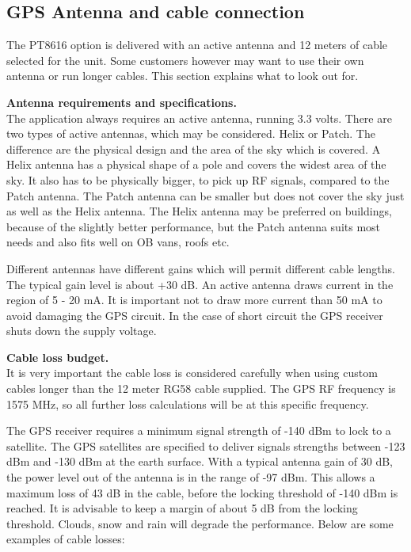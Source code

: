 \subsection{GPS Antenna and cable connection}

The PT8616 option is delivered with an active antenna and 12 meters of cable selected for the unit. Some customers however may want to use their own antenna or run longer cables. This section explains what to look out for.

\textbf{Antenna requirements and specifications.}\\
The application always requires an active antenna, running 3.3 volts. There are two types of active antennas, which may be considered. Helix or Patch. The difference are the physical design and the area of the sky which is covered. A Helix antenna has a physical shape of a pole and covers the widest area of the sky. It also has to be physically bigger, to pick up RF signals, compared to the Patch antenna. The Patch antenna can be smaller but does not cover the sky just as well as the Helix antenna. The Helix antenna may be preferred on buildings, because of the slightly better performance, but the Patch antenna suits most needs and also fits well on OB vans, roofs etc.

Different antennas have different gains which will permit different cable lengths. The typical gain level is about +30 dB. An active antenna draws current in the region of 5 - 20 mA. It is important not to draw more current than 50 mA to avoid damaging the GPS circuit. In the case of short circuit the GPS receiver shuts down the supply voltage.

\textbf{Cable loss budget.}\\
It is very important the cable loss is considered carefully when using custom cables longer than the 12 meter RG58 cable supplied. The GPS RF frequency is 1575 MHz, so all further loss calculations will be at this specific frequency. 

The GPS receiver requires a minimum signal strength of -140 dBm to lock to a satellite. The GPS satellites are specified to deliver signals strengths between -123 dBm and -130 dBm at the earth surface. With a typical antenna  gain of 30 dB, the power level out of the antenna is in the range of -97 dBm. This allows a maximum loss of 43 dB in the cable, before the locking threshold of -140 dBm is reached. It is advisable to keep a margin of about 5 dB from the locking threshold. Clouds, snow and rain will degrade the performance.
Below are some examples of cable losses:

